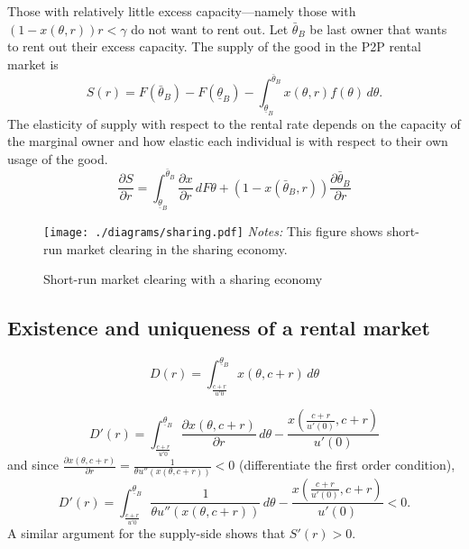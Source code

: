 \documentclass[11pt]{article}
\begin{document}
Those with relatively little excess capacity---namely those with $(1 - x(\theta, r))r < \gamma$ do not want to rent out. 
Let $\bar{\theta}_B$ be last owner that wants to rent out their excess capacity. 
The supply of the good in the P2P rental market is
\begin{equation}
S(r) = F(\bar{\theta}_B) - F(\underline{\theta}_B) - \int_{\underline{\theta}_B}^{\bar{\theta}_B} x(\theta, r)f(\theta) \, d\theta.
\end{equation} 
The elasticity of supply with respect to the rental rate depends on the capacity of the marginal owner and how elastic each individual is with respect to their own usage of the good. 
\begin{equation}
\frac{\partial S}{\partial r} = \int_{\underline{\theta}_B}^{\bar{\theta}_B} \frac{\partial x}{\partial r}\, dF\theta + (1 - x(\bar{\theta}_B, r)) \frac{\partial \bar{\theta}_B}{\partial r} 
\end{equation} 

\begin{figure}
\caption{Short-run market clearing with a sharing economy \label{fig:sharing_economy}} 
\centering 
\begin{minipage}{0.75 \textwidth} 
\texttt{[image: ./diagrams/sharing.pdf]}
{\footnotesize
\newline \emph{Notes:} This figure shows short-run market clearing in the sharing economy. 
}
\end{minipage}  
\end{figure} 

\subsection{Existence and uniqueness of a rental market} 

\begin{equation}
D(r) = \int_{\frac{c+r}{u'{0}}}^{\underline{\theta}_B} x(\theta, c +
r)\, d\theta  
\end{equation} 

\begin{equation}
D'(r) = \int_{\frac{c+r}{u'{0}}}^{\underline{\theta}_B} \frac{\partial x(\theta, c +
r)}{\partial r}\, d\theta - \frac{x\left(\frac{c+r}{u'(0)}, c + r\right)}{u'(0)} 
\end{equation} 
and since $\frac{\partial x(\theta, c+r)}{\partial r} =
\frac{1}{\theta u''(x(\theta, c + r))} < 0$ (differentiate the first
order condition), 
\begin{equation}
D'(r) = \int_{\frac{c+r}{u'{0}}}^{\underline{\theta}_B}
\frac{1}{\theta u''(x(\theta, c + r))}\, d\theta -
\frac{x\left(\frac{c+r}{u'(0)}, c + r\right)}{u'(0)}  < 0. 
\end{equation} 
A similar argument for the supply-side shows that $S'(r) > 0$. 
\end{document}
